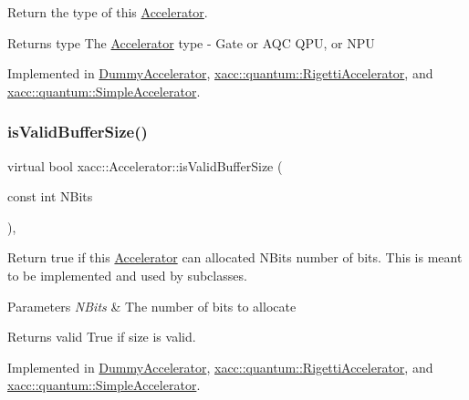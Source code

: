 Return the type of this \hyperlink{a01084}{Accelerator}.

\begin{DoxyReturn}{Returns}
type The \hyperlink{a01084}{Accelerator} type -\/ Gate or A\+QC Q\+PU, or N\+PU 
\end{DoxyReturn}


Implemented in \hyperlink{a00976_acdfe3e856f2bacc9e0dc1a51782a52e3}{Dummy\+Accelerator}, \hyperlink{a00916_aab0d4674da5273d55407b9ab77cde890}{xacc\+::quantum\+::\+Rigetti\+Accelerator}, and \hyperlink{a00944_ad76eeb0bbd7de21aad5bd20d20970a98}{xacc\+::quantum\+::\+Simple\+Accelerator}.

\mbox{\label{a01084_ae51584850faeec77299058383977ddeb}} 
\subsubsection{\texorpdfstring{is\+Valid\+Buffer\+Size()}{isValidBufferSize()}}
{\footnotesize\ttfamily virtual bool xacc\+::\+Accelerator\+::is\+Valid\+Buffer\+Size (\begin{DoxyParamCaption}\item[{const int}]{N\+Bits }\end{DoxyParamCaption})\hspace{0.3cm}{\ttfamily [protected]}, {}}

Return true if this \hyperlink{a01084}{Accelerator} can allocated N\+Bits number of bits. This is meant to be implemented and used by subclasses.


\begin{DoxyParams}{Parameters}
{\em N\+Bits} & The number of bits to allocate \\
\hline
\end{DoxyParams}
\begin{DoxyReturn}{Returns}
valid True if size is valid. 
\end{DoxyReturn}


Implemented in \hyperlink{a00976_a831ad0c71864920cc49a00d29768af8c}{Dummy\+Accelerator}, \hyperlink{a00916_a61352c07062597aad2393fbeed4cc025}{xacc\+::quantum\+::\+Rigetti\+Accelerator}, and \hyperlink{a00944_a60b9db2d6aed235857c45413a070338e}{xacc\+::quantum\+::\+Simple\+Accelerator}.

\mbox{\label{a01084_ac3e781f42ec25e460174d4c41ea26b94}} 

